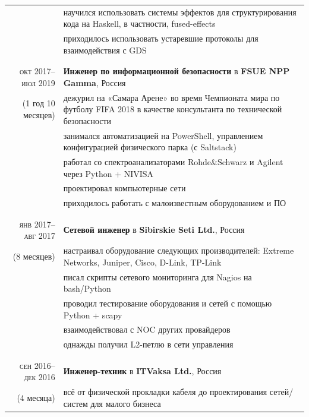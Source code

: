 \documentclass[a4paper,11pt]{article}
\begin{document}
\begin{longtable}{r|p{}}
                         & научился использовать системы эффектов для структурирования кода на Haskell, в частности, fused-effects   \\
                         & приходилось использовать устаревшие протоколы для взаимодействия с GDS                                        \\
      \\&\\
      \textsc{окт 2017--июл 2019} & \large \sffamily \textbf{Инженер по информационной безопасности} в \textbf{FSUE NPP Gamma},
                                    Россия                                                                               \\
      \nopagebreak
      (1 год 10 месяцев) & дежурил на «Самара Арене» во время Чемпионата мира по футболу FIFA 2018 в качестве консультанта по технической безопасности
                            \\
                          & занимался автоматизацией на PowerShell, управлением конфигурацией физического парка (с Saltstack)   \\
                          & работал со спектроанализаторами Rohde\&Schwarz и Agilent через Python + NIVISA               \\
                          & проектировал компьютерные сети                                                                   \\
                          & приходилось работать с малоизвестным оборудованием и ПО                                              \\
      \\&\\
      \textsc{янв 2017--авг 2017} & \large \sffamily \textbf{Сетевой инженер} в \textbf{Sibirskie Seti Ltd.}, Россия   \\
      \nopagebreak
      (8 месяцев) & настраивал оборудование следующих производителей: Extreme Networks, Juniper, Cisco, D-Link, TP-Link      \\
                 & писал скрипты сетевого мониторинга для Nagios на bash/Python                                         \\
                 & проводил тестирование оборудования и сетей с помощью Python + scapy                                           \\
                 & взаимодействовал с NOC других провайдеров                                                                  \\
                 & однажды получил L2-петлю в сети управления                                                         \\
      \\&\\
      \textsc{сен 2016--дек 2016} & \large \sffamily \textbf{Инженер-техник} в \textbf{ITVaksa Ltd.}, Россия    \\
      \nopagebreak
      (4 месяца) & всё от физической прокладки кабеля до проектирования сетей/систем для малого бизнеса                              \\
    \end{longtable}
\end{document}
